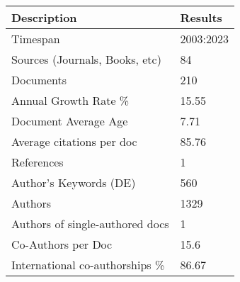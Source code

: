 
\begin{tabular}{ll}
\toprule
Description & Results\\
\midrule
Timespan & 2003:2023\\
Sources (Journals, Books, etc) & 84\\
Documents & 210\\
Annual Growth Rate \% & 15.55\\
Document Average Age & 7.71\\
\addlinespace
Average citations per doc & 85.76\\
References & 1\\
Author's Keywords (DE) & 560\\
Authors & 1329\\
Authors of single-authored docs & 1\\
\addlinespace
Co-Authors per Doc & 15.6\\
International co-authorships \% & 86.67\\
\bottomrule
\end{tabular}